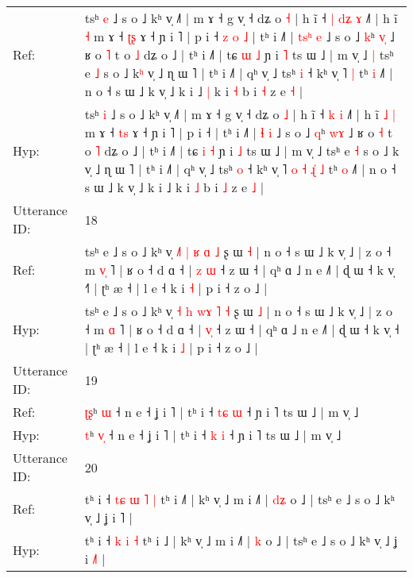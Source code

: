 \documentclass[10pt]{article}
\DeclareRobustCommand{\hl}[1]{{\textcolor{red}{#1}}}
\begin{document}
\begin{longtable}{ll}
Ref: & tsʰ \hl{e} ˩ s o ˩ kʰ v̩ ˩˥ | m ɤ ˧ g v̩ ˧ dʑ o \hl{˧} | h ĩ ˧\hl{ }\hl{|} \hl{d}\hl{ʑ} \hl{ɤ} ˩˥ | h ĩ\hl{}\hl{} \hl{˧} m ɤ ˧ \hl{ʈ}\hl{ʂ} ɤ ˧ ɲ i ˥ | p i ˧\hl{ }\hl{z}\hl{ }\hl{o}\hl{ }\hl{˩} | tʰ i ˩˥ | \hl{t}\hl{s}\hl{ʰ} \hl{e} ˩ s o ˩ \hl{k}ʰ \hl{v}\hl{̩} ˩ ʁ o \hl{˥} t o \hl{˩} dʑ o ˩ | tʰ i ˩˥ | tɕ \hl{ɯ} \hl{˩} ɲ i \hl{˥} ts ɯ ˩ | m v̩ ˩\hl{ }\hl{|} tsʰ e \hl{˩} s o ˩ k\hl{ʰ} v̩ ˩ ɳ ɯ ˥ | tʰ i ˩˥ | qʰ v̩ ˩ tsʰ \hl{i} ˧ kʰ v̩ ˥\hl{}\hl{}\hl{}\hl{}\hl{}\hl{}\hl{} \hl{|} tʰ \hl{i} ˩˥ | n o ˧ s ɯ ˩ k v̩ ˩ k i ˩\hl{ }\hl{|} k i \hl{˧} b i \hl{˧} z e \hl{˧} |
 \\
Hyp: & tsʰ \hl{i} ˩ s o ˩ kʰ v̩ ˩˥ | m ɤ ˧ g v̩ ˧ dʑ o \hl{˩} | h ĩ ˧\hl{}\hl{} \hl{}\hl{k} \hl{i} ˩˥ | h ĩ\hl{ }\hl{˩} \hl{|} m ɤ ˧ \hl{t}\hl{s} ɤ ˧ ɲ i ˥ | p i ˧\hl{}\hl{}\hl{}\hl{}\hl{}\hl{} | tʰ i ˩˥ | \hl{}\hl{}\hl{ɬ} \hl{i} ˩ s o ˩ \hl{q}ʰ \hl{w}\hl{ɤ} ˩ ʁ o \hl{˧} t o \hl{˥} dʑ o ˩ | tʰ i ˩˥ | tɕ \hl{i} \hl{˧} ɲ i \hl{˩} ts ɯ ˩ | m v̩ ˩\hl{}\hl{} tsʰ e \hl{˧} s o ˩ k\hl{} v̩ ˩ ɳ ɯ ˥ | tʰ i ˩˥ | qʰ v̩ ˩ tsʰ \hl{o} ˧ kʰ v̩ ˥\hl{ }\hl{o}\hl{ }\hl{˧}\hl{ }\hl{ɻ}\hl{̍} \hl{˩} tʰ \hl{o} ˩˥ | n o ˧ s ɯ ˩ k v̩ ˩ k i ˩\hl{}\hl{} k i \hl{˩} b i \hl{˩} z e \hl{˩} |
 \\
\midrule
Utterance ID: & 18 \\
Ref: & tsʰ e ˩ s o ˩ kʰ v̩ \hl{˩}\hl{˥} \hl{|} \hl{}\hl{ʁ} \hl{ɑ} \hl{˩} ʂ ɯ \hl{˧} | n o ˧ s ɯ ˩ k v̩ ˩ | z o ˧ m \hl{v}\hl{̩} ˥ | ʁ o ˧ d ɑ ˧ | \hl{z}\hl{ }\hl{ɯ} ˧ z ɯ ˧ | qʰ ɑ ˩ n e ˩˥ | ɖ ɯ ˧ k v̩ ˧\hl{˥} | ʈʰ æ ˧ | l e ˧ k i \hl{˧} | p i ˧ z o ˩ |
 \\
Hyp: & tsʰ e ˩ s o ˩ kʰ v̩ \hl{}\hl{˧} \hl{h} \hl{w}\hl{ɤ} \hl{˥} \hl{˧} ʂ ɯ \hl{˩} | n o ˧ s ɯ ˩ k v̩ ˩ | z o ˧ m \hl{}\hl{ɑ} ˥ | ʁ o ˧ d ɑ ˧ | \hl{}\hl{v}\hl{̩} ˧ z ɯ ˧ | qʰ ɑ ˩ n e ˩˥ | ɖ ɯ ˧ k v̩ ˧\hl{} | ʈʰ æ ˧ | l e ˧ k i \hl{˩} | p i ˧ z o ˩ |
 \\
\midrule
Utterance ID: & 19 \\
Ref: & \hl{ʈ}\hl{ʂ}ʰ \hl{}\hl{ɯ} ˧ n e ˧ ʝ i ˥ | tʰ i ˧ \hl{t}\hl{ɕ} \hl{ɯ} ˧ ɲ i ˥ ts ɯ ˩ | m v̩ ˩
 \\
Hyp: & \hl{}\hl{t}ʰ \hl{v}\hl{̩} ˧ n e ˧ ʝ i ˥ | tʰ i ˧ \hl{}\hl{k} \hl{i} ˧ ɲ i ˥ ts ɯ ˩ | m v̩ ˩
 \\
\midrule
Utterance ID: & 20 \\
Ref: & tʰ i ˧\hl{ }\hl{t}\hl{ɕ} \hl{ɯ} \hl{˥} \hl{|} tʰ i ˩\hl{˥} | kʰ v̩ ˩ m i ˩˥ | \hl{d}\hl{ʑ} o ˩ | tsʰ e ˩ s o ˩ kʰ v̩ ˩ ʝ i \hl{}˥ |
 \\
Hyp: & tʰ i ˧\hl{}\hl{}\hl{} \hl{k} \hl{i} \hl{˧} tʰ i ˩\hl{} | kʰ v̩ ˩ m i ˩˥ | \hl{}\hl{k} o ˩ | tsʰ e ˩ s o ˩ kʰ v̩ ˩ ʝ i \hl{˩}˥ |

\end{longtable}
\end{document}
